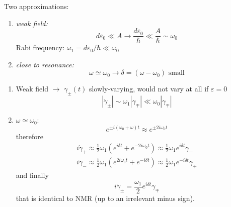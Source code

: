 \documentclass[12pt]{article}
\newcommand{\be}{\begin{equation}}
\newcommand{\ee}{\end{equation}}
\begin{document}
Two approximations:
\begin{enumerate}
\item\emph{weak field:}
\be
d\varepsilon_{0} \ll A \rightarrow \frac{d \varepsilon_{0}}{\hbar} \ll \frac{A}{\hbar} \sim \omega_{0}
\ee
Rabi frequency: $\omega_{1}=d \varepsilon_{0} / \hbar \ll \omega_{0}$
\item\emph{close to resonance:}
\be
\omega \simeq \omega_0 \rightarrow \delta = (\omega-\omega_0)\text{ small}
\ee
\end{enumerate}

\begin{enumerate}
\item Weak field $\to$ $\gamma_\pm(t)$ slowly-varying,
would not vary at all if $\varepsilon = 0$ 
\be
|\dot{\gamma}_{\pm}|
\sim \omega_{1} |\gamma_{\mp}|
\ll
\omega_{0}|\gamma_{\mp}|
\ee
\setcounter{equation}{78}
\item $\omega \simeq \omega_0$: 
\be
e^{\pm i\left(\omega_{0}+\omega\right) t} \approx e^{\pm 2 i \omega_{0} t}
\ee
therefore
\be
\begin{gathered}
i \dot{\gamma}_{+} \approx \frac{1}{2} \omega_{1}\left(e^{i \delta t}+e^{-2 i \omega_{0} t}\right) 
\approx \frac{1}{2} \omega_{1} e^{i \delta t} \gamma_{-}\\
i \dot{\gamma}_{-} \approx \frac{1}{2} \omega_{1}\left(e^{2 i \omega_{0} t}+e^{-i \delta t}\right)
\approx \frac{1}{2} \omega_{1} e^{-i \delta t} \gamma_{+}
\end{gathered}
\ee
and finally 
\be
i \dot{\gamma}_{\pm}=\frac{\omega_{1}}{2} e^{i \delta t} \gamma_{\mp}
\ee
that is identical to NMR (up to an irrelevant minus sign).
\end{enumerate}
\end{document}
